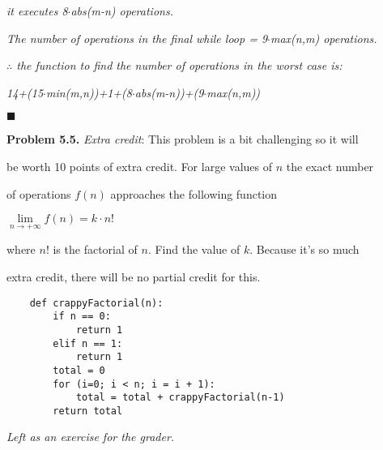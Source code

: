 \documentclass{article}
\begin{document}
\textit{it executes 8$\cdot$abs(m-n) operations.}

\vspace{0.25cm} 

\textit{The number of operations in the final while loop = 9$\cdot$max(n,m) operations.}

\vspace{0.25cm} 

\textit{$\therefore$ the function to find the number of operations in the worst case is:}

\begin{center}
	\textit{14+(15$\cdot$min(m,n))+1+(8$\cdot$abs(m-n))+(9$\cdot$max(n,m))} 
\end{center}

$\blacksquare$

\vspace{0.5cm} 

\textbf{Problem 5.5.} \textit{Extra credit}: This problem is a bit challenging so it will 

be worth 10 points of extra credit. For large values of $n$ the exact number 

of operations $f(n)$ approaches the following function 

\begin{center}
	$\lim\limits_{n \to +\infty} f(n) = k \cdot n!$
\end{center}

where $n!$ is the factorial of $n$. Find the value of $k$. Because it's so much 

extra credit, there will be no partial credit for this.

\begin{verbatim}
	def crappyFactorial(n):
		if n == 0:
			return 1
		elif n == 1:
			return 1
		total = 0
		for (i=0; i < n; i = i + 1):
			total = total + crappyFactorial(n-1)
		return total
\end{verbatim}

\vspace{0.5cm}

\begin{center}
	\textit{Left as an exercise for the grader.}
\end{center}
\end{document}
